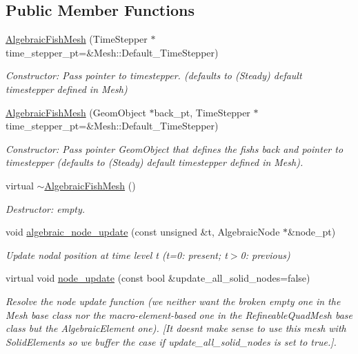 \subsection*{Public Member Functions}
\begin{DoxyCompactItemize}
\item 
\hyperlink{classoomph_1_1AlgebraicFishMesh_a4382cbf0c75b2b76c9b28e9bae45fd4f}{Algebraic\+Fish\+Mesh} (Time\+Stepper $\ast$time\+\_\+stepper\+\_\+pt=\&Mesh\+::\+Default\+\_\+\+Time\+Stepper)
\begin{DoxyCompactList}\small\item\em Constructor\+: Pass pointer to timestepper. (defaults to (Steady) default timestepper defined in Mesh) \end{DoxyCompactList}\item 
\hyperlink{classoomph_1_1AlgebraicFishMesh_aac4b7f18a6e1d10c64edf431af921ce7}{Algebraic\+Fish\+Mesh} (Geom\+Object $\ast$back\+\_\+pt, Time\+Stepper $\ast$time\+\_\+stepper\+\_\+pt=\&Mesh\+::\+Default\+\_\+\+Time\+Stepper)
\begin{DoxyCompactList}\small\item\em Constructor\+: Pass pointer Geom\+Object that defines the fish\textquotesingle{}s back and pointer to timestepper (defaults to (Steady) default timestepper defined in Mesh). \end{DoxyCompactList}\item 
virtual \hyperlink{classoomph_1_1AlgebraicFishMesh_a027d54d158e22ce8fe3c1246cb030440}{$\sim$\+Algebraic\+Fish\+Mesh} ()
\begin{DoxyCompactList}\small\item\em Destructor\+: empty. \end{DoxyCompactList}\item 
void \hyperlink{classoomph_1_1AlgebraicFishMesh_ac66d6542472dac702a7414aa9d7f995f}{algebraic\+\_\+node\+\_\+update} (const unsigned \&t, Algebraic\+Node $\ast$\&node\+\_\+pt)
\begin{DoxyCompactList}\small\item\em Update nodal position at time level t (t=0\+: present; t$>$0\+: previous) \end{DoxyCompactList}\item 
virtual void \hyperlink{classoomph_1_1AlgebraicFishMesh_a39cd5a86b0f762efd09f4fefba6da1c3}{node\+\_\+update} (const bool \&update\+\_\+all\+\_\+solid\+\_\+nodes=false)
\begin{DoxyCompactList}\small\item\em Resolve the node update function (we neither want the broken empty one in the Mesh base class nor the macro-\/element-\/based one in the Refineable\+Quad\+Mesh base class but the Algebraic\+Element one). \mbox{[}It doesn\textquotesingle{}t make sense to use this mesh with Solid\+Elements so we buffer the case if update\+\_\+all\+\_\+solid\+\_\+nodes is set to true.\mbox{]}. \end{DoxyCompactList}\item 

\end{DoxyCompactItemize}
